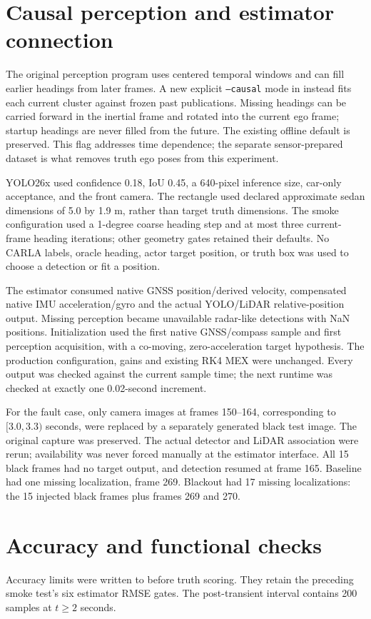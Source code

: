 \documentclass[11pt]{article}
\begin{document}
\section{Causal perception and estimator connection}
The original perception program uses centered temporal windows and can fill
earlier headings from later frames. A new explicit \texttt{--causal} mode
in  instead fits each current
cluster against frozen past publications. Missing headings can be carried
forward in the inertial frame and rotated into the current ego frame; startup
headings are never filled from the future. The existing offline default is
preserved. This flag addresses time dependence; the separate sensor-prepared
dataset is what removes truth ego poses from this experiment.

YOLO26x used confidence 0.18, IoU 0.45, a 640-pixel inference size, car-only
acceptance, and the front camera. The rectangle used declared approximate
sedan dimensions of 5.0 by 1.9 m, rather than target truth dimensions.
The smoke configuration used a 1-degree coarse heading step and at most three
current-frame heading iterations; other geometry gates retained their defaults.
No CARLA labels, oracle heading, actor target position, or truth box was used
to choose a detection or fit a position.

The estimator consumed native GNSS position/derived velocity, compensated
native IMU acceleration/gyro and the actual YOLO/LiDAR relative-position
output. Missing perception became unavailable radar-like detections with NaN
positions. Initialization used the first native GNSS/compass sample and first
perception acquisition, with a co-moving, zero-acceleration target hypothesis.
The production configuration, gains and existing RK4 MEX were unchanged.
Every output was checked against the current sample time; the next runtime
was checked at exactly one 0.02-second increment.

For the fault case, only camera images at frames 150--164, corresponding to
$[3.0,3.3)$ seconds, were replaced by a separately generated black test image.
The original capture was preserved. The actual detector and LiDAR association
were rerun; availability was never forced manually at the estimator interface.
All 15 black frames had no target output, and detection resumed at frame 165.
Baseline had one missing localization, frame 269. Blackout had 17 missing
localizations: the 15 injected black frames plus frames 269 and 270.

\section{Accuracy and functional checks}
Accuracy limits were written to  before truth scoring.
They retain the preceding smoke test's six estimator RMSE gates. The
post-transient interval contains 200 samples at $t\geq2$ seconds.
\end{document}

